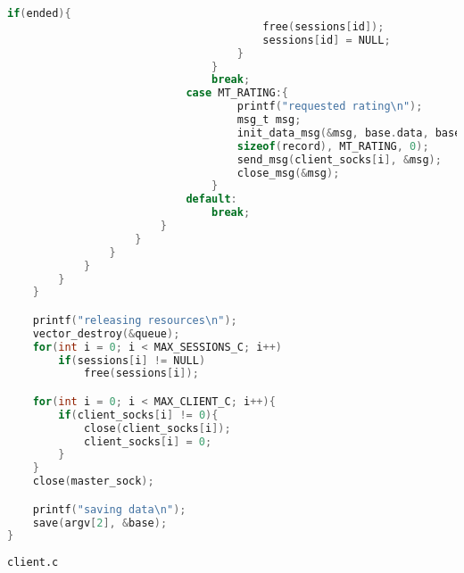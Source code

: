 \documentclass[12pt]{article}
\begin{document}
\begin{lstlisting}[language=C, basicstyle=\scriptsize]
                                    if(ended){
                                        free(sessions[id]);
                                        sessions[id] = NULL;
                                    }
                                }
                                break;
                            case MT_RATING:{
                                    printf("requested rating\n");
                                    msg_t msg;
                                    init_data_msg(&msg, base.data, base.count *
                                    sizeof(record), MT_RATING, 0);
                                    send_msg(client_socks[i], &msg);
                                    close_msg(&msg);
                                }
                            default:
                                break;
                        }
                    }
                }
            }
        }
    }

    printf("releasing resources\n");
    vector_destroy(&queue);
    for(int i = 0; i < MAX_SESSIONS_C; i++)
        if(sessions[i] != NULL)
            free(sessions[i]);

    for(int i = 0; i < MAX_CLIENT_C; i++){
        if(client_socks[i] != 0){
            close(client_socks[i]);
            client_socks[i] = 0;
        }
    }
    close(master_sock);

    printf("saving data\n");
    save(argv[2], &base);
}
\end{lstlisting}
\verb|client.c|
\end{document}
